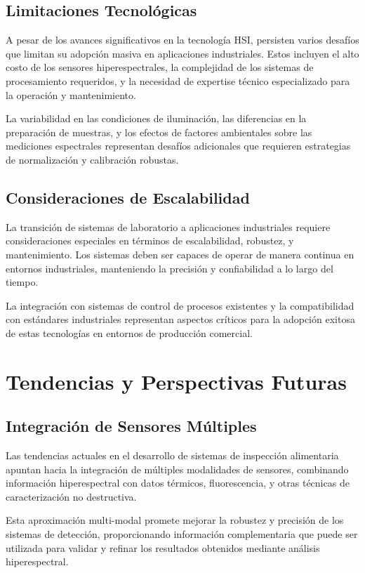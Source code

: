 \subsection{Limitaciones Tecnológicas}
A pesar de los avances significativos en la tecnología HSI, persisten varios desafíos que limitan su adopción masiva en aplicaciones industriales. Estos incluyen el alto costo de los sensores hiperespectrales, la complejidad de los sistemas de procesamiento requeridos, y la necesidad de expertise técnico especializado para la operación y mantenimiento.

La variabilidad en las condiciones de iluminación, las diferencias en la preparación de muestras, y los efectos de factores ambientales sobre las mediciones espectrales representan desafíos adicionales que requieren estrategias de normalización y calibración robustas.

\subsection{Consideraciones de Escalabilidad}
La transición de sistemas de laboratorio a aplicaciones industriales requiere consideraciones especiales en términos de escalabilidad, robustez, y mantenimiento. Los sistemas deben ser capaces de operar de manera continua en entornos industriales, manteniendo la precisión y confiabilidad a lo largo del tiempo.

La integración con sistemas de control de procesos existentes y la compatibilidad con estándares industriales representan aspectos críticos para la adopción exitosa de estas tecnologías en entornos de producción comercial.

\section{Tendencias y Perspectivas Futuras}

\subsection{Integración de Sensores Múltiples}
Las tendencias actuales en el desarrollo de sistemas de inspección alimentaria apuntan hacia la integración de múltiples modalidades de sensores, combinando información hiperespectral con datos térmicos, fluorescencia, y otras técnicas de caracterización no destructiva.

Esta aproximación multi-modal promete mejorar la robustez y precisión de los sistemas de detección, proporcionando información complementaria que puede ser utilizada para validar y refinar los resultados obtenidos mediante análisis hiperespectral.

